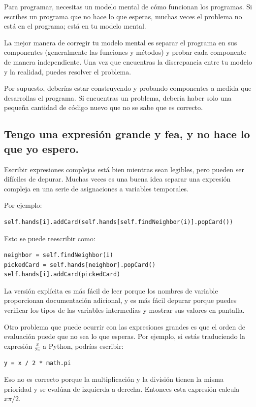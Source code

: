\documentclass[10pt]{book}
\begin{document}
Para programar, necesitas un modelo mental de cómo
funcionan los programas.  Si escribes un programa que no hace lo que esperas,
muchas veces el problema no está en el programa; está en tu modelo
mental.

La mejor manera de corregir tu modelo mental es separar el programa
en sus componentes (generalmente las funciones y métodos) y probar
cada componente de manera independiente.  Una vez que encuentras la discrepancia
entre tu modelo y la realidad, puedes resolver el problema.

Por supuesto, deberías estar construyendo y probando componentes a medida que
desarrollas el programa.  Si encuentras un problema,
debería haber solo una pequeña cantidad de código nuevo
que no se sabe que es correcto.


\subsection{Tengo una expresión grande y fea, y no
hace lo que yo espero.}

Escribir expresiones complejas está bien mientras sean legibles,
pero pueden ser difíciles de depurar.  Muchas veces es una buena idea
separar una expresión compleja en una serie de asignaciones a
variables temporales.

Por ejemplo:

\begin{verbatim}
self.hands[i].addCard(self.hands[self.findNeighbor(i)].popCard())
\end{verbatim}
%
Esto se puede reescribir como:

\begin{verbatim}
neighbor = self.findNeighbor(i)
pickedCard = self.hands[neighbor].popCard()
self.hands[i].addCard(pickedCard)
\end{verbatim}
%
La versión explícita es más fácil de leer porque los nombres de variable
proporcionan documentación adicional, y es más fácil depurar
porque puedes verificar los tipos de las variables intermedias
y mostrar sus valores en pantalla.

Otro problema que puede ocurrir con las expresiones grandes es que
el orden de evaluación puede que no sea lo que esperas.
Por ejemplo, si estás traduciendo la expresión
$\frac{x}{2 \pi}$ a Python, podrías escribir:

\begin{verbatim}
y = x / 2 * math.pi
\end{verbatim}
%
Eso no es correcto porque la multiplicación y la división tienen
la misma prioridad y se evalúan de izquierda a derecha.
Entonces esta expresión calcula $x \pi / 2$.
\end{document}
